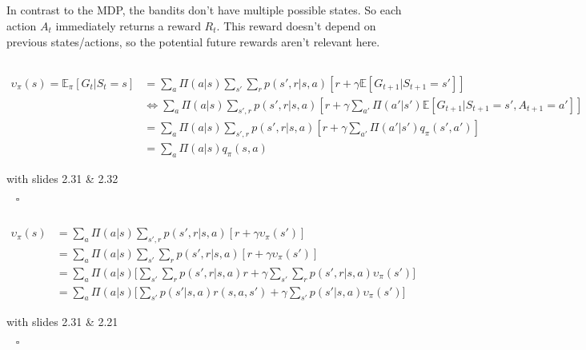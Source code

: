 \documentclass[11pt,a4paper]{article}
\begin{document}
\subsection{}
In contrast to the MDP, the bandits don't have multiple possible states. So each action $A_{t}$ immediately returns a reward $R_{t}$.
This reward doesn't depend on previous states/actions, so the potential future rewards aren't relevant here.


\subsection{}

\begin{align*}
    \upsilon_{\pi}(s)    = \mathbb{E}_{\pi}[G_{t}|S_{t}=s] 
                    & = \sum_{a}\Pi(a|s)\sum_{s'}\sum_{r}p(s',r|s,a)[r+\gamma\mathbb{E}[G_{t+1}|S_{t+1}=s']]\\
                    & \Leftrightarrow \sum_{a}\Pi(a|s)\sum_{s',r}p(s',r|s,a)[r+\gamma\sum_{a'}\Pi(a'|s')\mathbb{E}[G_{t+1}|S_{t+1}=s', A_{t+1}=a']]\\
                    & = \sum_{a}\Pi(a|s)\sum_{s',r}p(s',r|s,a)[r+\gamma\sum_{a'}\Pi(a'|s')q_{\pi}(s',a')]\\
                    & = \sum_{a}\Pi(a|s)q_{\pi}(s,a)
\end{align*}

\begin{flushright}
    \begin{footnotesize}
        with slides 2.31 \& 2.32 
    \end{footnotesize}
    $\;\;\;\square$
\end{flushright}

\subsection{} 

\begin{align*}
    \upsilon_{\pi}(s) & = \sum_{a}\Pi(a|s)\sum_{s',r}p(s',r|s,a)[r+\gamma\upsilon_{\pi}(s')]\\
                      & = \sum_{a}\Pi(a|s)\sum_{s'}\sum_{r}p(s',r|s,a)[r+\gamma\upsilon_{\pi}(s')]\\
                      & = \sum_{a}\Pi(a|s)\bigg[\sum_{s'}\sum_{r}p(s',r|s,a)r+\gamma\sum_{s'}\sum_{r}p(s',r|s,a)\upsilon_{\pi}(s')\biggr]\\
                      & = \sum_{a}\Pi(a|s)\bigg[\sum_{s'}p(s'|s,a)r(s,a,s')+\gamma\sum_{s'}p(s'|s,a)\upsilon_{\pi}(s')\biggr]
\end{align*}

\begin{flushright}
    \begin{footnotesize}
        with slides 2.31 \& 2.21 
    \end{footnotesize}
    $\;\;\;\square$
\end{flushright}
\end{document}
